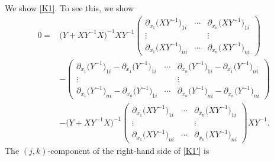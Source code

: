 \documentclass[pdftex]{sigma}
\numberwithin{equation}{section}
\begin{document}
We show \eqref{K1}. To see this, we show
\begin{align}
0={}& \bigl(Y+XY^{-1}X\bigr)^{-1}XY^{-1}
\begin{pmatrix}
\partial_{x_1}\bigl(XY^{-1}\bigr)_{1i} & \cdots & \partial_{x_n}\bigl(XY^{-1}\bigr)_{1i} \\
\vdots & & \vdots \\
\partial_{x_1}\bigl(XY^{-1}\bigr)_{ni} & \cdots & \partial_{x_n}\bigl(XY^{-1}\bigr)_{ni}
\end{pmatrix} \nonumber \\
&-
\begin{pmatrix}
\partial_{x_1}\bigl(Y^{-1}\bigr)_{1i}-\partial_{x_1}\bigl(Y^{-1}\bigr)_{1i} & \cdots & \partial_{x_n}\bigl(Y^{-1}\bigr)_{1i}-\partial_{x_1}\bigl(Y^{-1}\bigr)_{ni} \\
\vdots & & \vdots \\
\partial_{x_1}\bigl(Y^{-1}\bigr)_{ni}-\partial_{x_n}\bigl(Y^{-1}\bigr)_{1i} & \cdots & \partial_{x_n}\bigl(Y^{-1}\bigr)_{ni}-\partial_{x_n}\bigl(Y^{-1}\bigr)_{ni}
\end{pmatrix}\nonumber \\
&-\bigl(Y+XY^{-1}X\bigr)^{-1}
\begin{pmatrix}
\partial_{x_1}\bigl(XY^{-1}\bigr)_{1i} & \cdots & \partial_{x_n}\bigl(XY^{-1}\bigr)_{1i} \\
\vdots & & \vdots \\
\partial_{x_1}\bigl(XY^{-1}\bigr)_{ni} & \cdots & \partial_{x_n}\bigl(XY^{-1}\bigr)_{ni}
\end{pmatrix}XY^{-1}.\label{K1'}
\end{align}
The $(j,k)$-component of the right-hand side of \eqref{K1'} is
\end{document}
